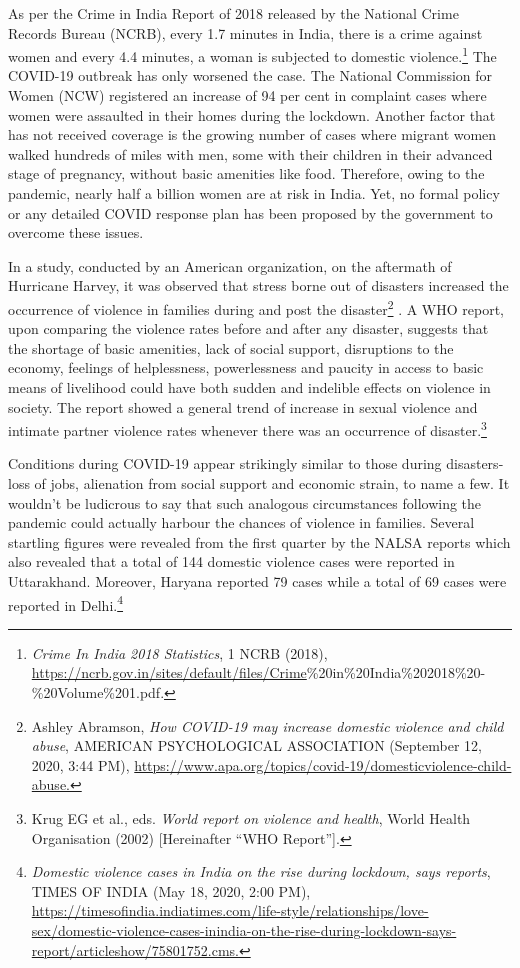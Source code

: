 \begin{multicols}{2}
\noi
As per the Crime in India Report of 2018 released by the National Crime Records Bureau
(NCRB), every 1.7 minutes in India, there is a crime against women and every 4.4 minutes, a
woman is subjected to domestic violence.\footnote{\textit{Crime In India 2018 Statistics}, 1 NCRB (2018),\\\url{https://ncrb.gov.in/sites/default/files/Crime}\%20in\%20India\%202018\%20-\%20Volume\%201.pdf.}
 The COVID-19 outbreak has only worsened the
case. The National Commission for Women (NCW) registered an increase of 94 per cent in
complaint cases where women were assaulted in their homes during the lockdown. Another
factor that has not received coverage is the growing number of cases where migrant women
walked hundreds of miles with men, some with their children in their advanced stage of
pregnancy, without basic amenities like food. Therefore, owing to the pandemic, nearly half a
billion women are at risk in India. Yet, no formal policy or any detailed COVID response
plan has been proposed by the government to overcome these issues.
 
 
 \noi
In a study, conducted by an American organization, on the aftermath of Hurricane Harvey, it
was observed that stress borne out of disasters increased the occurrence of violence in
families during and post the disaster\footnote{Ashley Abramson, \textit{How COVID-19 may increase domestic violence and child abuse}, AMERICAN
PSYCHOLOGICAL ASSOCIATION (September 12, 2020, 3:44 PM), \url{https://www.apa.org/topics/covid-19/domesticviolence-child-abuse.}}
. A WHO report, upon comparing the violence rates
before and after any disaster, suggests that the shortage of basic amenities, lack of social
support, disruptions to the economy, feelings of helplessness, powerlessness and paucity in
access to basic means of livelihood could have both sudden and indelible effects on violence
in society. The report showed a general trend of increase in sexual violence and intimate
partner violence rates whenever there was an occurrence of disaster.\footnote{Krug EG et al., eds. \textit{World report on violence and health}, World Health Organisation (2002) [Hereinafter
“WHO Report”].} 
 
 \noi
Conditions during COVID-19 appear strikingly similar to those during disasters- loss of jobs,
alienation from social support and economic strain, to name a few. It wouldn’t be ludicrous to
say that such analogous circumstances following the pandemic could actually harbour the
chances of violence in families. Several startling figures were revealed from the first quarter
by the NALSA reports which also revealed that a total of 144 domestic violence cases were reported in Uttarakhand. Moreover, Haryana reported 79 cases while a total of 69 cases were
reported in Delhi.\footnote{\textit{Domestic violence cases in India on the rise during lockdown, says reports}, TIMES OF INDIA (May 18, 2020,
2:00 PM),\\ \url{https://timesofindia.indiatimes.com/life-style/relationships/love-sex/domestic-violence-cases-inindia-on-the-rise-during-lockdown-says-report/articleshow/75801752.cms.}}



\end{multicols}
